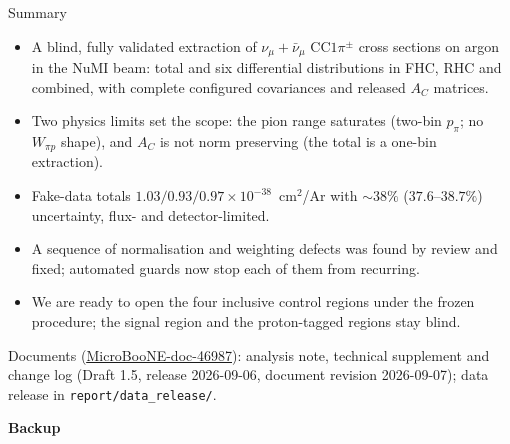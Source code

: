\documentclass[aspectratio=169,10pt]{beamer}
\begin{document}
\begin{frame}{Summary}
  \small
  \begin{itemize}\itemsep4pt
    \item A blind, fully validated extraction of $\nu_\mu+\bar\nu_\mu$ CC$1\pi^\pm$ cross sections on argon in the NuMI beam: total and six differential distributions in FHC, RHC and combined, with complete configured covariances and released $A_C$ matrices.
    \item Two physics limits set the scope: the pion range saturates (two-bin $p_\pi$; no $W_{\pi p}$ shape), and $A_C$ is not norm preserving (the total is a one-bin extraction).
    \item Fake-data totals $1.03/0.93/0.97\times10^{-38}$~cm$^2$/Ar with $\sim\!38\%$ ($37.6$--$38.7\%$) uncertainty, flux- and detector-limited.
    \item A sequence of normalisation and weighting defects was found by review and fixed; automated guards now stop each of them from recurring.
    \item \alert{We are ready to open the four inclusive control regions under the frozen procedure}; the signal region and the proton-tagged regions stay blind.
  \end{itemize}
  \vspace{4pt}
  \footnotesize Documents (\href{https://microboone-docdb.fnal.gov/cgi-bin/sso/ShowDocument?docid=46987}{\color{ubred}\underline{MicroBooNE-doc-46987}}): analysis note, technical supplement and change log (Draft 1.5, release 2026-09-06, document revision 2026-09-07); data release in \texttt{report/data\_release/}.
\end{frame}

\appendix
{
\begin{frame}[plain]
  \centering\Huge\color{ubdark}\bfseries Backup
\end{frame}}
\end{document}
